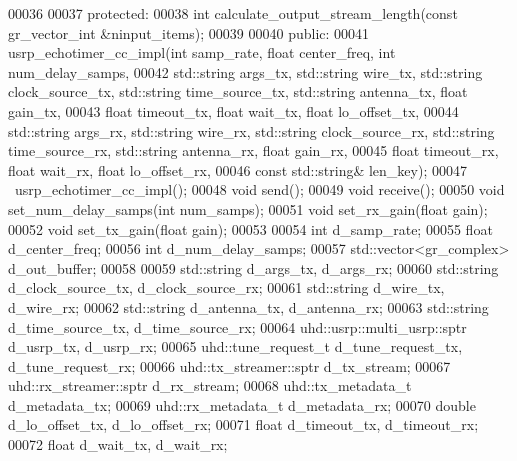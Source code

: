 \begin{DoxyCode}
00036 
00037      \textcolor{keyword}{protected}:
00038       \textcolor{keywordtype}{int} calculate_output_stream_length(\textcolor{keyword}{const} gr\_vector\_int &ninput\_items);
00039 
00040      \textcolor{keyword}{public}:
00041       usrp_echotimer_cc_impl(\textcolor{keywordtype}{int} samp_rate, \textcolor{keywordtype}{float} center_freq, \textcolor{keywordtype}{int} num\_delay\_samps,
00042         std::string args\_tx, std::string wire\_tx, std::string clock\_source\_tx, 
      std::string time\_source\_tx, std::string antenna\_tx, \textcolor{keywordtype}{float} gain\_tx,
00043         \textcolor{keywordtype}{float} timeout\_tx, \textcolor{keywordtype}{float} wait\_tx, \textcolor{keywordtype}{float} lo\_offset\_tx,
00044         std::string args\_rx, std::string wire\_rx, std::string clock\_source\_rx, 
      std::string time\_source\_rx, std::string antenna\_rx, \textcolor{keywordtype}{float} gain\_rx,
00045         \textcolor{keywordtype}{float} timeout\_rx, \textcolor{keywordtype}{float} wait\_rx, \textcolor{keywordtype}{float} lo\_offset\_rx,
00046         \textcolor{keyword}{const} std::string& len\_key);
00047       ~usrp_echotimer_cc_impl();
00048       \textcolor{keywordtype}{void} send();
00049       \textcolor{keywordtype}{void} receive();
00050       \textcolor{keywordtype}{void} set_num_delay_samps(\textcolor{keywordtype}{int} num\_samps);
00051       \textcolor{keywordtype}{void} set_rx_gain(\textcolor{keywordtype}{float} gain);
00052       \textcolor{keywordtype}{void} set_tx_gain(\textcolor{keywordtype}{float} gain);
00053       
00054       \textcolor{keywordtype}{int} d_samp_rate;
00055       \textcolor{keywordtype}{float} d_center_freq;
00056       \textcolor{keywordtype}{int} d_num_delay_samps;
00057       std::vector<gr\_complex> d_out_buffer;
00058       
00059       std::string d_args_tx, d_args_rx;
00060       std::string d_clock_source_tx, d_clock_source_rx;
00061       std::string d_wire_tx, d_wire_rx;
00062       std::string d_antenna_tx, d_antenna_rx;
00063       std::string d_time_source_tx, d_time_source_rx;
00064       uhd::usrp::multi\_usrp::sptr d_usrp_tx, d_usrp_rx;
00065       uhd::tune\_request\_t d_tune_request_tx, d_tune_request_rx;
00066       uhd::tx\_streamer::sptr d_tx_stream;
00067       uhd::rx\_streamer::sptr d_rx_stream;
00068       uhd::tx\_metadata\_t d_metadata_tx;
00069       uhd::rx\_metadata\_t d_metadata_rx;
00070       \textcolor{keywordtype}{double} d_lo_offset_tx, d_lo_offset_rx;
00071       \textcolor{keywordtype}{float} d_timeout_tx, d_timeout_rx;
00072       \textcolor{keywordtype}{float} d_wait_tx, d_wait_rx;

\end{DoxyCode}
